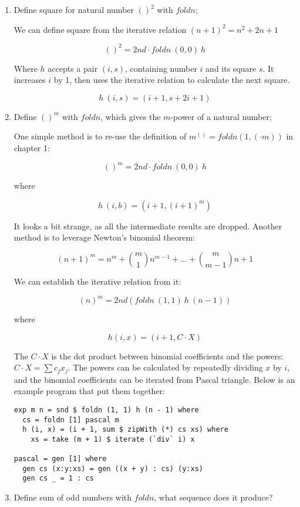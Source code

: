 \documentclass[UTF8]{article}
\begin{document}
\begin{enumerate}
\item Define square for natural number $()^2$ with $foldn$;

We can define square from the iterative relation $(n+1)^2 = n^2 + 2n + 1$

\[
()^2 = 2nd \cdot foldn\ (0, 0)\ h
\]

Where $h$ accepts a pair $(i, s)$, containing number $i$ and its square $s$. It increases $i$ by 1, then uses the iterative relation to calculate the next square.

\[
h\ (i, s) = (i + 1, s + 2i + 1)
\]

\item Define $()^m$ with $foldn$, which gives the $m$-power of a natural number;

One simple method is to re-use the definition of $m^{()} = foldn(1, (\cdot m))$ in chapter 1:

\[
()^m = 2nd \cdot foldn\ (0, 0)\ h
\]

where

\[
h\ (i, b) = (i + 1, (i + 1)^m)
\]

It looks a bit strange, as all the intermediate results are dropped. Another method is to leverage Newton's binomial theorem:

\[
(n + 1)^m = n^m + \binom{m}{1} n^{m-1} + ... + \binom{m}{m-1} n + 1
\]

We can establish the iterative relation from it:

\[
(n)^m = 2nd(foldn\ (1, 1)\ h\ (n - 1))
\]

where

\[
h (i, x) = (i + 1, C \cdot X)
\]

The $C \cdot X$ is the dot product between binomial coefficients and the powers: $C \cdot X = \sum c_j x_j$. The powers can be calculated by repeatedly dividing $x$ by $i$, and the binomial coefficients can be iterated from Pascal triangle. Below is an example program that put them together:

\lstset{language=Haskell
    , frame=single
}
\begin{lstlisting}
exp m n = snd $ foldn (1, 1) h (n - 1) where
  cs = foldn [1] pascal m
  h (i, x) = (i + 1, sum $ zipWith (*) cs xs) where
    xs = take (m + 1) $ iterate (`div` i) x

pascal = gen [1] where
  gen cs (x:y:xs) = gen ((x + y) : cs) (y:xs)
  gen cs _ = 1 : cs
\end{lstlisting} %

\item Define sum of odd numbers with $foldn$, what sequence does it produce?



\end{enumerate}
\end{document}
